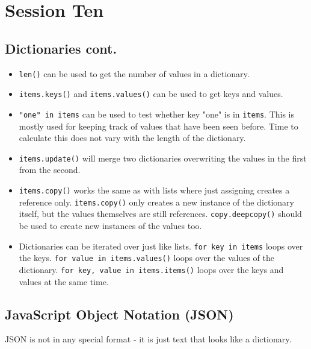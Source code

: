 \section{Session Ten}\label{sec:session_ten}

\subsection{Dictionaries cont.}\label{sub:dictionaries_cont_}

\begin{itemize}
    \item \texttt{len()} can be used to get the number of values in a dictionary.
    \item \texttt{items.keys()} and \texttt{items.values()} can be used to get keys and values.
    \item \texttt{"one" in items} can be used to test whether key "one" is in \texttt{items}.
        This is mostly used for keeping track of values that have been seen before.
        Time to calculate this does not vary with the length of the dictionary.
    \item \texttt{items.update()} will merge two dictionaries overwriting the values in the first from the second.
    \item \texttt{items.copy()} works the same as with lists where just assigning creates a reference only.
        \texttt{items.copy()} only creates a new instance of the dictionary itself, but the values themselves are still references.
        \texttt{copy.deepcopy()} should be used to create new instances of the values too.
    \item Dictionaries can be iterated over just like lists.
        \texttt{for key in items} loops over the keys.
        \texttt{for value in items.values()} loops over the values of the dictionary.
        \texttt{for key, value in items.items()} loops over the keys and values at the same time.
\end{itemize}

\subsection{JavaScript Object Notation (JSON)}\label{sub:javascript_object_notation_json_}

JSON is not in any special format - it is just text that looks like a dictionary.

